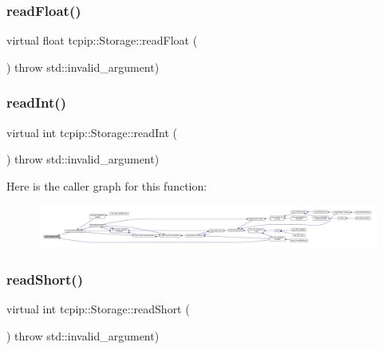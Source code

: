 \subsubsection{\texorpdfstring{read\+Float()}{readFloat()}}
{\footnotesize\ttfamily virtual float tcpip\+::\+Storage\+::read\+Float (\begin{DoxyParamCaption}{ }\end{DoxyParamCaption}) throw  std\+::invalid\+\_\+argument) \hspace{0.3cm}{\ttfamily [virtual]}}

\mbox{\label{classtcpip_1_1_storage_a04d2fd214a905ad99e9cda8ee7b813e4}} 
\subsubsection{\texorpdfstring{read\+Int()}{readInt()}}
{\footnotesize\ttfamily virtual int tcpip\+::\+Storage\+::read\+Int (\begin{DoxyParamCaption}{ }\end{DoxyParamCaption}) throw  std\+::invalid\+\_\+argument) \hspace{0.3cm}{\ttfamily [virtual]}}

Here is the caller graph for this function\+:\nopagebreak
\begin{figure}[H]
\begin{center}
\leavevmode
\includegraphics[width=350pt]{classtcpip_1_1_storage_a04d2fd214a905ad99e9cda8ee7b813e4_icgraph}
\end{center}
\end{figure}
\mbox{\label{classtcpip_1_1_storage_a73b9af4fa50e74cb02390240f30fa0c9}} 
\subsubsection{\texorpdfstring{read\+Short()}{readShort()}}
{\footnotesize\ttfamily virtual int tcpip\+::\+Storage\+::read\+Short (\begin{DoxyParamCaption}{ }\end{DoxyParamCaption}) throw  std\+::invalid\+\_\+argument) \hspace{0.3cm}{\ttfamily [virtual]}}

